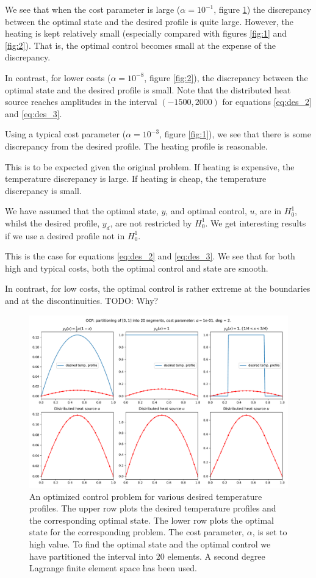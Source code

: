 We see that when the cost parameter is large (\( \alpha = 10^{-1} \), figure \ref{fig:0})
the discrepancy between the optimal state and the
desired profile is quite large.
However, the heating is kept relatively small
(especially compared with figures \ref{fig:1} and \ref{fig:2}).
That is, the optimal control becomes small at the
expense of the discrepancy.

In contrast, for lower costs (\( \alpha = 10^{-8} \),
figure \ref{fig:2}), the discrepancy between the optimal state
and the desired profile is small. 
Note that the distributed heat source reaches amplitudes in
the interval \( (-1500,2000) \) for equations \eqref{eq:des_2} and \eqref{eq:des_3}.

Using a typical cost parameter (\( \alpha = 10^{-3} \), figure \ref{fig:1}),
we see that there is some discrepancy from the
desired profile. The heating profile is reasonable.

This is to be expected given the original problem.
If heating is expensive, the temperature discrepancy is large.
If heating is cheap, the temperature discrepancy is small.

We have assumed that the optimal state, \( y \), and optimal control, \( u \),
are in $H_0^1$, whilst the desired profile, \( y_d \),
are not restricted by \( H_0^1 \).
We get interesting results if we use a desired profile not in $H_0^1$.

This is the case for equations \eqref{eq:des_2} and \eqref{eq:des_3}.
We see that for both high and typical costs,
both the optimal control and state are smooth.

In contrast, for low costs, the optimal control
is rather extreme at the boundaries and at
the discontinuities. TODO: Why?

\begin{figure}
  \centering
  \includegraphics[width=\textwidth]{Images/plots/task2_fig_0.pdf}
  \caption{An optimized control problem for various
    desired temperature profiles. The upper row plots the
    desired temperature profiles and the corresponding 
    optimal state. The lower row plots the
    optimal state for the corresponding problem.
    The cost parameter, $\alpha$, is set to high value.
    To find the optimal state and the optimal control we 
    have partitioned the interval into \( 20 \) elements.
    A second degree Lagrange finite element space has been used.}
  \label{fig:0}
\end{figure}

